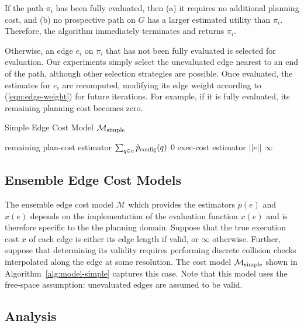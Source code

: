If the path $\pi_i$ has been fully evaluated,
then (a) it requires no additional planning cost,
and (b) no prospective path on $G$ has a larger estimated utility
than $\pi_i$.
Therefore, the algorithm immediately terminates and returns $\pi_i$.

Otherwise,
an edge $e_i$ on $\pi_i$ that has not been fully evaluated
is selected for evaluation.
Our experiments simply select the unevaluated edge
nearest to an end of the path,
although other selection strategies are possible.
Once evaluated,
the estimates for $e_i$ are recomputed,
modifying its edge weight according to (\ref{eqn:edge-weight})
for future iterations.
For example, if it is fully evaluated,
its remaining planning cost becomes zero.

\begin{algorithm}[t]
\caption{Simple Edge Cost Model $\mathcal{M}_{\mbox{\scriptsize simple}}$}
\label{alg:model-simple}
\begin{algorithmic}[1]
   \Comment remaining plan-cost estimator
      \State \Return $\sum_{q \in e} \grave{p}_{\mbox{\scriptsize config}}(q)$
   \Else
      \State \Return $0$
   \EndIf
\EndFunction
{}
   \Comment exec-cost estimator
      \State \Return $||e||$
   \Else
      \State \Return $\infty$
   \EndIf
\EndFunction
\end{algorithmic}
\end{algorithm}

\subsection{Ensemble Edge Cost Models}

The ensemble edge cost model $\mathcal{M}$
which provides the estimators $\grave{p}(e)$ and $\hat{x}(e)$
depends on the implementation of the evaluation function $x(e)$
and is therefore specific to the the planning domain.
Suppose that the true execution cost $x$ of each edge
is either its edge length if valid, or $\infty$ otherwise.
Further,
suppose that determining its validity requires performing
discrete collision checks interpolated along the edge at some
resolution.
The cost model $\mathcal{M}_{\mbox{\scriptsize simple}}$ shown in
Algorithm~\ref{alg:model-simple}
captures this case.
Note that this model uses the free-space assumption:
unevaluated edges are assumed to be valid.

\subsection{Analysis}

